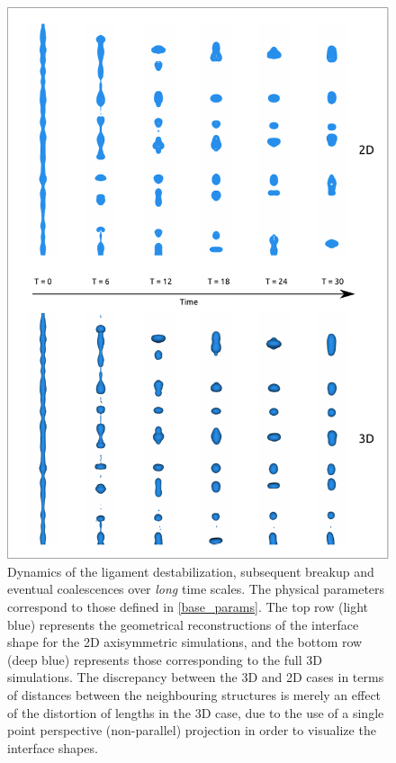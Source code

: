 \begin{figure}
\centering
\includegraphics{plots/ligament_breakup/3d_vs_2d_long.pdf}
	\caption{Dynamics of the ligament destabilization, subsequent breakup 
	and eventual coalescences over \textit{long} time scales. 
	The physical parameters correspond to those defined in \eqref{base_params}.
	The top row (light blue) represents the geometrical reconstructions of 
	the interface shape for the 2D axisymmetric simulations, and the bottom 
	row (deep blue) represents those corresponding to the full 3D simulations.
	The discrepancy between the 3D and 2D cases in terms of distances between
	the neighbouring structures is merely an effect of the distortion of lengths
	in the 3D case, due to the use of a single point perspective (non-parallel) 
	projection in order to visualize the interface shapes. 
	}
\label{2d_3d_long}
\end{figure}

